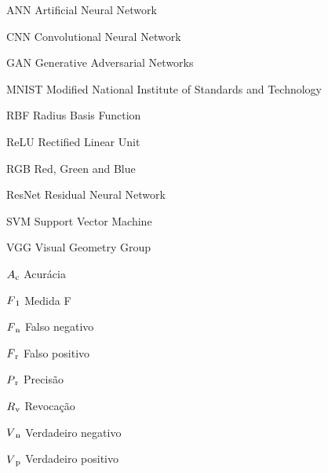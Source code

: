 \documentclass[
	12pt,				%
	oneside,			%
	a4paper,			%
	english,			%
	brazil				%
	]{abntex2ppgsi}
\begin{document}
\listoffigures*
\cleardoublepage




\listoftables*
\cleardoublepage

%
%
\begin{siglas}
  \item[ANN] Artificial Neural Network
  \item[CNN] Convolutional Neural Network
  \item[GAN] Generative Adversarial Networks
  \item[MNIST] Modified National Institute of Standards and Technology
  \item[RBF] Radius Basis Function
  \item[ReLU] Rectified Linear Unit
  \item[RGB] Red, Green and Blue
  \item[ResNet] Residual Neural Network
  \item[SVM] Support Vector Machine
  \item[VGG] Visual Geometry Group
\end{siglas}

%
% 
\begin{simbolos}
  \item[$ A\textsubscript{c} $] Acurácia
  \item[$ F\textsubscript{1} $] Medida F
  \item[$ F\textsubscript{n} $] Falso negativo
  \item[$ F\textsubscript{r} $] Falso positivo
  \item[$ P\textsubscript{r} $] Precisão
  \item[$ R\textsubscript{v} $] Revocação
  \item[$ V\textsubscript{n} $] Verdadeiro negativo
  \item[$ V\textsubscript{p} $] Verdadeiro positivo
\end{simbolos}
\end{document}
